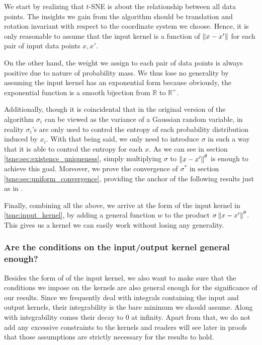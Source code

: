 We start by realizing that $t$-SNE is about the relationship between all data
points. The insights we gain from the algorithm should be translation and
rotation invariant with respect to the coordinate system we choose. Hence, it
is only reasonable to assume that the input kernel is a function of
$\left\lVert x-x'\right\rVert$ for each pair of input data points $x,x'$.

On the other hand, the weight we assign to each pair of data points is always
positive due to nature of probability mass. We thus lose no generality by
assuming the input kernel has an exponential form because obviously, the
exponential function is a smooth bijection from $\mathbb{R}$ to $\mathbb{R}^+$.

Additionally, though it is coincidental that in the original version of the
algorithm $\sigma_i$ can be viewed as the variance of a Gaussian random
variable, in reality $\sigma_i$'s are only used to control the entropy of each
probability distribution induced by $x_i$. With that being said, we only need
to introduce $\sigma$ in such a way that it is able to control the entropy for
each $x$. As we can see in section \ref{tsne:sec:existence_uniqueness}, simply
multiplying $\sigma$ to $\left\lVert x-x'\right\rVert^{\theta}$ is enough to achieve this goal.
Moreover, we prove the convergence of $\sigma^*$ in section
\ref{tsne:sec:uniform_convergence}, providing the anchor of the following
results just as in \cite{auffinger-tsne}.

Finally, combining all the above, we arrive at the form of the input kernel in
\eqref{tsne:input_kernel}, by adding a general function $w$ to the product
$\sigma \left\lVert x-x'\right\rVert^{\theta}$. This gives us a kernel we can easily work
without losing any generality.

\subsubsection*{Are the conditions on the input/output kernel general enough?}

Besides the form of of the input kernel, we also want to make sure that the
conditions we impose on the kernels are also general enough for the
significance of our results. Since we frequently deal with integrals containing
the input and output kernels, their integrability is the bare minimum we should
assume. Along with integrability comes their decay to 0 at infinity. Apart from
that, we do not add any excessive constraints to the kernels and readers will
see later in proofs that those assumptions are strictly necessary for the
results to hold.

